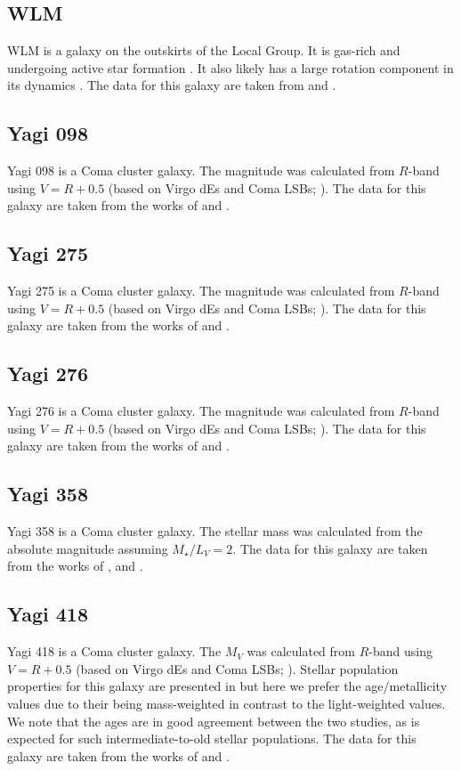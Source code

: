 \subsection{WLM}
WLM is a galaxy on the outskirts of the Local Group. It is gas-rich and undergoing active star formation \citep{Leaman2009}. It also likely has a large rotation component in its dynamics \citep{Leaman2009}.
The data for this galaxy are taken from \citet{mcconnachie2012} and \citet{Forbes2018}. 

\subsection{Yagi 098}
Yagi 098 is a Coma cluster galaxy. The magnitude was calculated from $R$-band using $V = R + 0.5$ (based on Virgo dEs and Coma LSBs; \citealp{vanZee2004, Alabi2020}). The data for this galaxy are taken from the works of \citet{Yagi2016, Alabi2018} and \citet{FerreMateu2018}. 

\subsection{Yagi 275}
Yagi 275 is a Coma cluster galaxy. The magnitude was calculated from $R$-band using $V = R + 0.5$ (based on Virgo dEs and Coma LSBs; \citealp{vanZee2004, Alabi2020}). The data for this galaxy are taken from the works of \citet{Yagi2016, Alabi2018, Chilingarian2019} and \citet{FerreMateu2018}. 

\subsection{Yagi 276}
Yagi 276 is a Coma cluster galaxy. The magnitude was calculated from $R$-band using $V = R + 0.5$ (based on Virgo dEs and Coma LSBs; \citealp{vanZee2004, Alabi2020}). The data for this galaxy are taken from the works of \citet{Yagi2016, Alabi2018} and \citet{FerreMateu2018}. 

\subsection{Yagi 358}
Yagi 358 is a Coma cluster galaxy. The stellar mass was calculated from the absolute magnitude assuming $M_{\star} / L_{V} =2$. The data for this galaxy are taken from the works of \citet{vanDokkum2017}, \citet{Lim2018} and \citet{Gannon2023}.  

\subsection{Yagi 418}
Yagi 418 is a Coma cluster galaxy. The $M_V$ was calculated from $R$-band using $V = R + 0.5$ (based on Virgo dEs and Coma LSBs; \citealp{vanZee2004, Alabi2020}). Stellar population properties for this galaxy are presented in \cite{RuizLara2018} but here we prefer the \cite{FerreMateu2023} age/metallicity values due to their being mass-weighted in contrast to the \citet{RuizLara2018} light-weighted values. We note that the ages are in good agreement between the two studies, as is expected for such intermediate-to-old stellar populations. The data for this galaxy are taken from the works of \citet{Yagi2016, Alabi2018} and \citet{FerreMateu2018}. 

